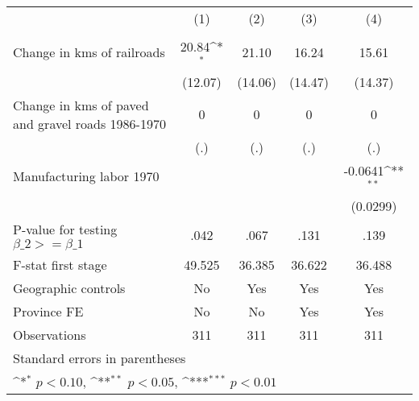 {
\def\sym#1{\ifmmode^{#1}\else\(^{#1}\)\fi}
\begin{tabular}{l*{4}{c}}
\hline\hline
                &\multicolumn{1}{c}{(1)}&\multicolumn{1}{c}{(2)}&\multicolumn{1}{c}{(3)}&\multicolumn{1}{c}{(4)}\\
                &\multicolumn{1}{c}{}&\multicolumn{1}{c}{}&\multicolumn{1}{c}{}&\multicolumn{1}{c}{}\\
\hline
Change in kms of railroads&    20.84\sym{*}  &    21.10         &    16.24         &    15.61         \\
                &  (12.07)         &  (14.06)         &  (14.47)         &  (14.37)         \\
[1em]
Change in kms of paved and gravel roads 1986-1970&        0         &        0         &        0         &        0         \\
                &      (.)         &      (.)         &      (.)         &      (.)         \\
[1em]
Manufacturing labor 1970&                  &                  &                  &  -0.0641\sym{**} \\
                &                  &                  &                  & (0.0299)         \\
\hline
P-value for testing $\beta\_{2} >= \beta\_{1}$&     .042         &     .067         &     .131         &     .139         \\
F-stat first stage&   49.525         &   36.385         &   36.622         &   36.488         \\
Geographic controls&       No         &      Yes         &      Yes         &      Yes         \\
Province FE     &       No         &       No         &      Yes         &      Yes         \\
Observations    &      311         &      311         &      311         &      311         \\
\hline\hline
\multicolumn{5}{l}{\footnotesize Standard errors in parentheses}\\
\multicolumn{5}{l}{\footnotesize \sym{*} \(p<0.10\), \sym{**} \(p<0.05\), \sym{***} \(p<0.01\)}\\
\end{tabular}
}
